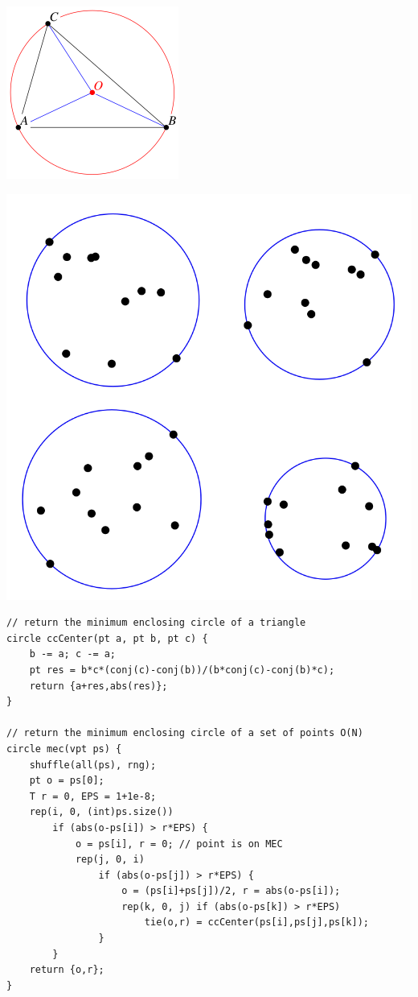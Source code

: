     \begin{center}
    \begin{minipage}{.3\textwidth}
    \centering
    \includegraphics{imgs/circumcenter.png}
    \end{minipage}%
    \begin{minipage}{0.7\textwidth}
    \centering
    \includegraphics[scale = 0.5]{imgs/mec.png}
    \end{minipage}
    \end{center}
    

    
    \begin{lstlisting}
// return the minimum enclosing circle of a triangle
circle ccCenter(pt a, pt b, pt c) { 
	b -= a; c -= a;
	pt res = b*c*(conj(c)-conj(b))/(b*conj(c)-conj(b)*c);
	return {a+res,abs(res)};
}

// return the minimum enclosing circle of a set of points O(N)
circle mec(vpt ps) {
	shuffle(all(ps), rng);
	pt o = ps[0]; 
    T r = 0, EPS = 1+1e-8;
	rep(i, 0, (int)ps.size()) 
        if (abs(o-ps[i]) > r*EPS) {
            o = ps[i], r = 0; // point is on MEC
            rep(j, 0, i) 
                if (abs(o-ps[j]) > r*EPS) {
                    o = (ps[i]+ps[j])/2, r = abs(o-ps[i]);
                    rep(k, 0, j) if (abs(o-ps[k]) > r*EPS) 
                        tie(o,r) = ccCenter(ps[i],ps[j],ps[k]);
                }
        }
	return {o,r};
}
    \end{lstlisting}
